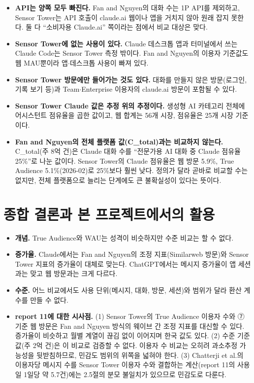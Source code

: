 \documentclass[11pt]{article}
\begin{document}
\begin{itemize}
  \item \textbf{API는 양쪽 모두 빠진다.} Fan and Nguyen의 대화 수는 1P API를 제외하고, Sensor Tower는 API 호출이 claude.ai 웹이나 앱을 거치지 않아 원래 잡지 못한다. 둘 다 ``소비자용 Claude.ai'' 쪽이라는 점에서 비교 대상은 맞다.
  \item \textbf{Sensor Tower에 없는 사용이 있다.} Claude 데스크톱 앱과 터미널에서 쓰는 Claude Code는 Sensor Tower 측정 밖이다. Fan and Nguyen의 이용자 기준값도 웹 MAU뿐이라 앱$\cdot$데스크톱 사용이 빠져 있다.
  \item \textbf{Sensor Tower 방문에만 들어가는 것도 있다.} 대화를 만들지 않은 방문(로그인, 기록 보기 등)과 Team$\cdot$Enterprise 이용자의 claude.ai 방문이 포함될 수 있다.
  \item \textbf{Sensor Tower Claude 값은 추정 위의 추정이다.} 생성형 AI 카테고리 전체에 어시스턴트 점유율을 곱한 값이고, 웹 합계는 56개 시장, 점유율은 25개 시장 기준이다.
  \item \textbf{Fan and Nguyen의 전체 플랫폼 값(C\_total)과는 비교하지 않는다.} C\_total(주 8억 건)은 Claude 대화 수를 ``전문가용 AI 대화 중 Claude 점유율 25\%''로 나눈 값이다. Sensor Tower의 Claude 점유율은 웹 방문 5.9\%, True Audience 5.1\%(2026-02)로 25\%보다 훨씬 낮다. 정의가 달라 곧바로 비교할 수는 없지만, 전체 플랫폼으로 늘리는 단계에도 큰 불확실성이 있다는 뜻이다.
\end{itemize}

\section{종합 결론과 본 프로젝트에서의 활용}

\begin{itemize}
  \item \textbf{개념.} True Audience와 WAU는 성격이 비슷하지만 수준 비교는 할 수 없다.
  \item \textbf{증가율.} Claude에서는 Fan and Nguyen의 조정 지표(Similarweb 방문)와 Sensor Tower 지표의 증가율이 대체로 맞는다. ChatGPT에서는 메시지 증가율이 앱 세션과는 맞고 웹 방문과는 크게 다르다.
  \item \textbf{수준.} 어느 비교에서도 사용 단위(메시지, 대화, 방문, 세션)와 범위가 달라 환산 계수를 만들 수 없다.
  \item \textbf{report 11에 대한 시사점.} (1) Sensor Tower의 True Audience 이용자 수와 ⑦ 기준 웹 방문은 Fan and Nguyen 방식의 웨이브 간 조정 지표를 대신할 수 있다. 증가율이 비슷하고 월별 계열이 끊김 없이 이어지며 한국 값도 있다. (2) 수준 기준값(주 2억 건)은 이 비교로 검증할 수 없다. 이용자 수 비교는 오히려 과소추정 가능성을 뒷받침하므로, 민감도 범위의 위쪽을 넓혀야 한다. (3) Chatterji et al.의 이용자당 메시지 수를 Sensor Tower 이용자 수와 결합하는 계산(report 11의 사용일 1일당 약 5.7건)에는 2.5절의 분모 불일치가 있으므로 민감도로 다룬다.
\end{itemize}
\end{document}
